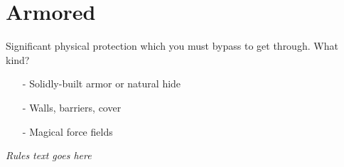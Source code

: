 \documentclass[parskip]{scrartcl}
\providecommand{\tightlist}{\setlength{\itemsep}{0pt}\setlength{\parskip}{0pt}} %
\begin{document}
	\section{Armored}
	\cardbodyfont
	Significant physical protection which you must bypass to get through. What kind?
	\cardpromptfont
	\begin{itemize}
		\tightlist
		\item[-] Solidly-built armor or natural hide
		\item[-] Walls, barriers, cover
		\item[-] Magical force fields
	\end{itemize}
	\vspace*{\fill}
	\cardrulefont
	\centering\emph{Rules text goes here}
\end{document}
